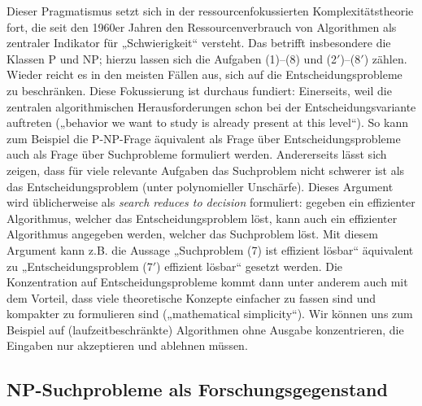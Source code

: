 Dieser Pragmatismus setzt sich in der ressourcenfokussierten Komplexitätstheorie fort, die seit den 1960er Jahren den Ressourcenverbrauch von Algorithmen als zentraler Indikator für „Schwierigkeit“ versteht. Das betrifft insbesondere die Klassen P und NP; hierzu lassen sich die Aufgaben (1)–(8) und (2$'$)–(8$'$) zählen.
Wieder reicht es in den meisten Fällen aus, sich auf die Entscheidungsprobleme zu beschränken.
Diese Fokussierung ist durchaus fundiert:
Einerseits, weil die zentralen algorithmischen Herausforderungen schon bei der Entscheidungsvariante auftreten („\foreignlanguage{english}{behavior we want to study is already present at this level}“).
So kann zum Beispiel die P-NP-Frage äquivalent als Frage über Entscheidungsprobleme auch als Frage über Suchprobleme formuliert werden. Andererseits lässt sich zeigen, dass für viele relevante Aufgaben das Suchproblem nicht schwerer ist als das Entscheidungsproblem (unter polynomieller Unschärfe). Dieses Argument wird üblicherweise als \emph{search reduces to decision} formuliert: gegeben ein effizienter Algorithmus, welcher das Entscheidungsproblem löst, kann auch ein effizienter Algorithmus angegeben werden, welcher das Suchproblem löst. Mit diesem Argument kann z.B. die Aussage „Suchproblem (7) ist effizient lösbar“ äquivalent zu „Entscheidungsproblem (7$'$) effizient lösbar“ gesetzt werden. Die Konzentration auf Entscheidungsprobleme kommt dann unter anderem auch mit dem Vorteil, dass viele theoretische Konzepte einfacher zu fassen sind und kompakter zu formulieren sind („mathematical simplicity“). Wir können uns zum Beispiel auf (laufzeitbeschränkte) Algorithmen ohne Ausgabe konzentrieren, die Eingaben nur akzeptieren und ablehnen müssen. 

\vspace{0pt plus 2ex}
\subsection*{NP-Suchprobleme als Forschungsgegenstand}

